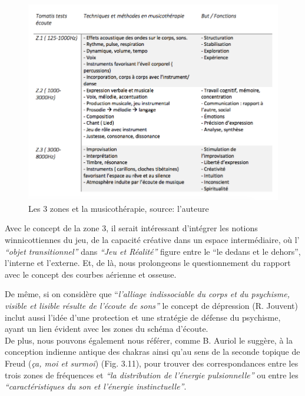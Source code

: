 \begin{figure}[tbh]
	\centering
	\includegraphics[width=0.9\linewidth]{images/testtechnmethbut}
	\caption[Zones du test avec la musicothérapie]{Les 3
		zones et la musicothérapie, source: l'auteure}
	
	\label{testbutetfonction}
\end{figure}
\clearpage

Avec le concept de la zone 3, il serait intéressant d'intégrer les notions winnicottiennes du jeu, de la 
capacité
créative dans un espace
intermédiaire, où l' \textit{``objet
	transitionnel'' } dans \textit{``Jeu et Réalité''}
\autocite{winnicott}
figure entre le ``le
dedans et le
dehors'',
l'interne et l'externe.  Et, de là, nous prolongeons le questionnement du
rapport avec le concept des
courbes aérienne et osseuse.

De même, si on considère que ``\emph{l'alliage indissociable du corps et du psychisme,
	visible et lisible résulte de l'écoute de
	sons''} \autocite{tomatis_conf1972}
le concept de dépression (R. Jouvent) \autocite{doronparot}  inclut aussi l'idée d'une protection et 
une stratégie de
défense du psychisme, ayant un lien évident avec les zones du schéma d'écoute.
\\
De plus, nous pouvons également nous référer, comme B. Auriol le suggère, à la conception indienne 
antique des chakras
ainsi qu'au sens de la seconde
topique de Freud (\textit{ça, moi et surmoi}) (Fig. 3.11), pour trouver des correspondances
entre les trois zones de
fréquences et \textit {``la distribution de l'énergie pulsionnelle''} ou entre
les
\textit{``caractéristiques du son et l'énergie
	instinctuelle''}\autocite[ch. 13]{auriol:cle}.


